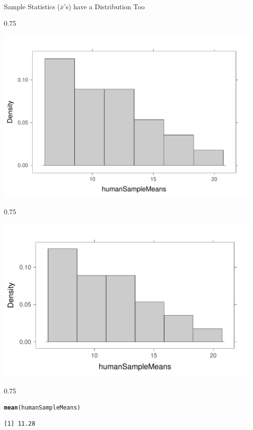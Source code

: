 \documentclass{beamer}\usepackage[]{graphicx}\usepackage[]{color}
\makeatletter
\newcommand{\hlstd}[1]{\textcolor[rgb]{0.102,0.102,0.102}{#1}}%
\newcommand{\hlkwd}[1]{\textcolor[rgb]{0.102,0.102,0.102}{\textbf{#1}}}%
\newenvironment{kframe}{%
 \def\at@end@of@kframe{}%
 \ifinner\ifhmode%
  \def\at@end@of@kframe{\end{minipage}}%
  \begin{minipage}{\columnwidth}%
 \fi\fi%
 \def\FrameCommand##1{\hskip\@totalleftmargin \hskip-\fboxsep
 \colorbox{shadecolor}{##1}\hskip-\fboxsep
     \hskip-\linewidth \hskip-\@totalleftmargin \hskip\columnwidth}%
 \MakeFramed {\advance\hsize-\width
   \@totalleftmargin\z@ \linewidth\hsize
   \@setminipage}}%
 {\par\unskip\endMakeFramed%
 \at@end@of@kframe}
\newenvironment{knitrout}{}{} %
\renewenvironment{knitrout}{\begin{spacing}{0.75}\begin{tiny}}{\end{tiny}\end{spacing}}
\newcommand{\xbar}{\overline{x}}
\makeatother
\begin{document}
\begin{frame}{Sample Statistics ($\xbar$'s) have a Distribution Too\;\;}
\begin{knitrout}
{\centering \includegraphics[width=0.79\linewidth]{figure/graphics-histogram-humanSampleMeans-1} 

}



\end{knitrout}
\newpage

\begin{knitrout}\small
{}\color{fgcolor}

{\centering \includegraphics[width=0.79\linewidth]{figure/graphics-histogram-humanSampleMeans-2-1} 

}



\end{knitrout}
\begin{knitrout}\small
{}\color{fgcolor}\begin{kframe}
\begin{alltt}
\hlkwd{mean}\hlstd{(humanSampleMeans)}
\end{alltt}
\begin{verbatim}
[1] 11.28
\end{verbatim}
\end{kframe}
\end{knitrout}



\end{frame}
\end{document}
